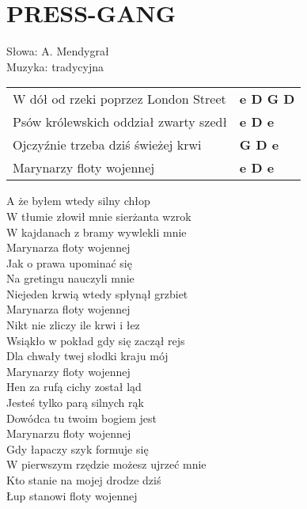 \section{PRESS-GANG}
Słowa: A. Mendygrał\\
Muzyka: tradycyjna

\vspace{2em}
\noindent
\begin{tabular}{@{}p{10cm}@{}l@{}}
W dół od rzeki poprzez London Street & \bfseries e D G D\\
Psów królewskich oddział zwarty szedł & \bfseries e D e\\
Ojczyźnie trzeba dziś świeżej krwi & \bfseries G D e\\
Marynarzy floty wojennej & \bfseries e D e\\
\end{tabular}

\vspace{1em}
A że byłem wtedy silny chłop \\
W tłumie złowił mnie sierżanta wzrok \\
W kajdanach z bramy wywlekli mnie \\
Marynarza floty wojennej \\


Jak o prawa upominać się \\
Na gretingu nauczyli mnie \\
Niejeden krwią wtedy spłynął grzbiet \\
Marynarza floty wojennej \\


Nikt nie zliczy ile krwi i łez \\
Wsiąkło w pokład gdy się zaczął rejs \\
Dla chwały twej słodki kraju mój \\
Marynarzy floty wojennej \\


Hen za rufą cichy został ląd \\
Jesteś tylko parą silnych rąk \\
Dowódca tu twoim bogiem jest \\
Marynarzu floty wojennej \\


Gdy łapaczy szyk formuje się \\
W pierwszym rzędzie możesz ujrzeć mnie \\
Kto stanie na mojej drodze dziś \\
Łup stanowi floty wojennej \\